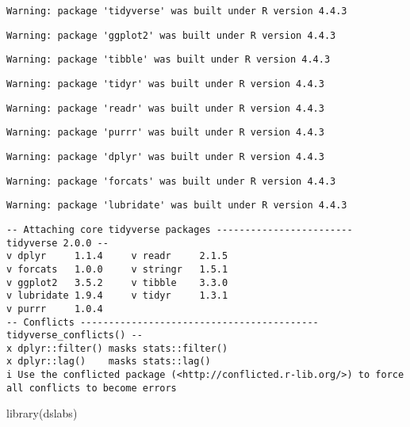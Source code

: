 \documentclass[
  letterpaper,
  DIV=11,
  numbers=noendperiod]{scrreprt}
\newenvironment{Shaded}{\begin{snugshade}}{\end{snugshade}}
\newcommand{\FunctionTok}[1]{\textcolor[rgb]{0.28,0.35,0.67}{#1}}
\newcommand{\NormalTok}[1]{\textcolor[rgb]{0.00,0.23,0.31}{#1}}
\begin{document}
\begin{verbatim}
Warning: package 'tidyverse' was built under R version 4.4.3
\end{verbatim}

\begin{verbatim}
Warning: package 'ggplot2' was built under R version 4.4.3
\end{verbatim}

\begin{verbatim}
Warning: package 'tibble' was built under R version 4.4.3
\end{verbatim}

\begin{verbatim}
Warning: package 'tidyr' was built under R version 4.4.3
\end{verbatim}

\begin{verbatim}
Warning: package 'readr' was built under R version 4.4.3
\end{verbatim}

\begin{verbatim}
Warning: package 'purrr' was built under R version 4.4.3
\end{verbatim}

\begin{verbatim}
Warning: package 'dplyr' was built under R version 4.4.3
\end{verbatim}

\begin{verbatim}
Warning: package 'forcats' was built under R version 4.4.3
\end{verbatim}

\begin{verbatim}
Warning: package 'lubridate' was built under R version 4.4.3
\end{verbatim}

\begin{verbatim}
-- Attaching core tidyverse packages ------------------------ tidyverse 2.0.0 --
v dplyr     1.1.4     v readr     2.1.5
v forcats   1.0.0     v stringr   1.5.1
v ggplot2   3.5.2     v tibble    3.3.0
v lubridate 1.9.4     v tidyr     1.3.1
v purrr     1.0.4     
-- Conflicts ------------------------------------------ tidyverse_conflicts() --
x dplyr::filter() masks stats::filter()
x dplyr::lag()    masks stats::lag()
i Use the conflicted package (<http://conflicted.r-lib.org/>) to force all conflicts to become errors
\end{verbatim}

\begin{Shaded}
\begin{Highlighting}[]
\FunctionTok{library}\NormalTok{(dslabs)}
\end{Highlighting}
\end{Shaded}
\end{document}
